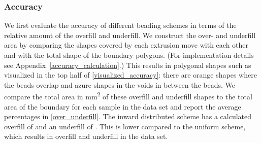 \subsubsection{Accuracy}
We first evaluate the accuracy of different beading schemes in terms of the relative amount of the overfill and underfill. 
We construct the over- and underfill area by comparing the shapes covered by each extrusion move  with each other and with the total shape of the boundary polygons. (For implementation details see Appendix~\ref{accuracy_calculation}.)
This results in polygonal shapes such as visualized in the top half of \cref{visualized_accuracy}:
there are orange shapes where the beads overlap and azure shapes in the voids in between the beads.
%
%
We compare the total area in \si{\milli\meter\squared} of these overfill and underfill shapes to the total area of the boundary for each sample in the data set
and report the average percentages in \cref{over_underfill}.
The inward distributed scheme has a calculated overfill of  and an underfill of .
This is lower compared to the uniform scheme, which results in  overfill and  underfill in the data set.

